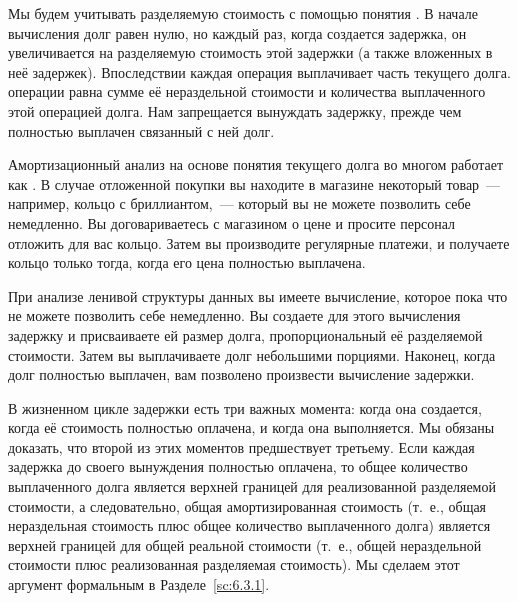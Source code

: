 Мы будем учитывать разделяемую стоимость с помощью понятия
.  В начале вычисления долг
равен нулю, но каждый раз, когда создается задержка, он увеличивается
на разделяемую стоимость этой задержки (а также вложенных в неё
задержек). Впоследствии каждая операция выплачивает часть текущего
долга.  операции
равна сумме её нераздельной стоимости и количества выплаченного этой
операцией долга. Нам запрещается вынуждать задержку, прежде чем
полностью выплачен связанный с ней долг.

\begin{remark}
  Амортизационный анализ на основе понятия текущего долга во многом
  работает как . В случае
  отложенной покупки вы находите в магазине некоторый товар~---
  например, кольцо с бриллиантом,~--- который вы не можете позволить себе
  немедленно. Вы договариваетесь с магазином о цене и просите персонал
  отложить для вас кольцо. Затем вы производите регулярные платежи, и
  получаете кольцо только тогда, когда его цена полностью выплачена.

  При анализе ленивой структуры данных вы имеете вычисление, которое
  пока что не можете позволить себе немедленно. Вы создаете для этого
  вычисления задержку и присваиваете ей размер долга, пропорциональный
  её разделяемой стоимости. Затем вы выплачиваете долг небольшими
  порциями. Наконец, когда долг полностью выплачен, вам позволено
  произвести вычисление задержки.
\end{remark}

В жизненном цикле задержки есть три важных момента: когда она
создается, когда её стоимость полностью оплачена, и когда она
выполняется. Мы обязаны доказать, что второй из этих моментов
предшествует третьему.  Если каждая задержка до своего вынуждения
полностью оплачена, то общее количество выплаченного долга является
верхней границей для реализованной разделяемой стоимости, а
следовательно, общая амортизированная стоимость (т.~е., общая
нераздельная стоимость плюс общее количество выплаченного долга)
является верхней границей для общей реальной стоимости (т.~е., общей
нераздельной стоимости плюс реализованная разделяемая стоимость). Мы
сделаем этот аргумент формальным в Разделе~\ref{sc:6.3.1}.

